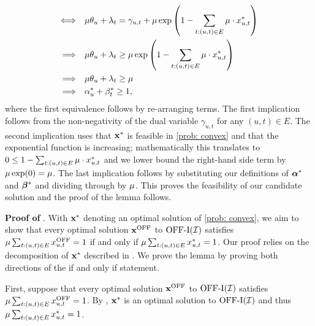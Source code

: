 {\begin{align}
         \Longleftrightarrow & \quad \mu \theta_u + \lambda_t = \gamma_{u,t} + \mu \exp\left( 1- \sum_{t: (u, t) \in E} \mu \cdot x^*_{u, t} \right)\notag\\
         \Longrightarrow & \quad \mu \theta_u + \lambda_t \geq \mu \exp\left( 1- \sum_{t: (u, t) \in E} \mu \cdot x^*_{u, t} \right) \notag\\
         \Longrightarrow & \quad \mu \theta_u + \lambda_t \geq \mu \notag\\
         \Longrightarrow & \quad \alpha^*_u + \beta^*_t \geq 1 \notag,
    \end{align}
    where the first equivalence follows by re-arranging terms. The first implication follows from the non-negativity of the dual variable $\gamma_{u,t}$ for any $(u,t) \in E$. The second implication uses that $\mathbf{x}^*$ is feasible in \ref{prob: convex} and that the exponential function is increasing; mathematically this translates to $0 \leq 1 - \sum_{t: (u, t) \in E} \mu \cdot x^*_{u, t}$ and we lower bound the right-hand side term by $ \mu \exp(0) = \mu$. The last implication follows by substituting our definitions of $\bm{\alpha}^*$ and $\bm{\beta}^*$ and dividing through  by $\mu$. This proves the feasibility of our candidate solution and the proof of the lemma follows.
    \hfill
    \Halmos


\noindent \textbf{Proof of }. 
With $\mathbf{x}^*$ denoting an optimal solution of \ref{prob: convex}, we aim to show that every optimal solution $\mathbf{x}^{\mathrm{OFF}}$ to $\mathrm{\mathrm{OFF}}\textrm{-}\mathrm{I}(\mathcal I)$ satisfies $\mu \sum_{t: (u,t) \in E} x^{\mathrm{OFF}}_{u,t} = 1$ if and only if $\mu \sum_{t: (u, t) \in E} x^*_{u, t} = 1$.
Our proof relies on the decomposition of $\mathbf{x}^*$ described in . We prove the lemma by proving both directions of the if and only if statement. 

First, suppose that every optimal solution $\mathbf{x}^{\mathrm{OFF}}$ to $\mathrm{\mathrm{OFF}}\textrm{-}\mathrm{I}(\mathcal I)$ satisfies $\mu \sum_{t: (u,t) \in E} x^{\mathrm{OFF}}_{u,t} = 1$. By ,  $\mathbf{x}^*$ is an optimal solution to $\mathrm{\mathrm{OFF}}\textrm{-}\mathrm{I}(\mathcal I)$ and thus $\mu \sum_{t: (u,t) \in E} x^{*}_{u,t} = 1$. 

}
